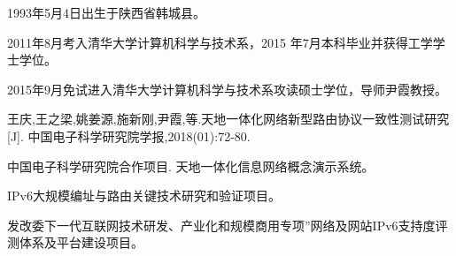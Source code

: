 \begin{resume}


  1993年5月4日出生于陕西省韩城县。

  2011年8月考入清华大学计算机科学与技术系，2015 年7月本科毕业并获得工学学士学位。

  2015年9月免试进入清华大学计算机科学与技术系攻读硕士学位，导师尹霞教授。


  \begin{publications}
    \item 王庆,王之梁,姚姜源,施新刚,尹霞,等.天地一体化网络新型路由协议一致性测试研究[J]. 中国电子科学研究院学报,2018(01):72-80.
  \end{publications}

%

  \begin{achievements}
    \item 中国电子科学研究院合作项目. 天地一体化信息网络概念演示系统。
    \item IPv6大规模编址与路由关键技术研究和验证项目。
    \item 发改委下一代互联网技术研发、产业化和规模商用专项”网络及网站IPv6支持度评测体系及平台建设项目。
  \end{achievements}

\end{resume}
